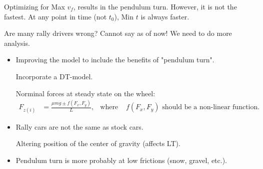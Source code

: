 \begin{frame}{}

    \begin{block}{}
        Optimizing for Max $v_f$, results in the pendulum turn. \newline However, it is not the fastest. At any point in time (not $t_0$), Min $t$ is always faster.
    \end{block}
    \pause
    \begin{exampleblock}{Are many rally drivers wrong?}
        Cannot say as of now! We need to do more analysis.
    \end{exampleblock}

    \pause
    \begin{itemize}
        \item Improving the model to include the benefits of "pendulum turn". \par Incorporate a DT-model. \par Norminal forces at steady state on the wheel: \begin{align*}
            F_{z(i)} &= \frac{\mu m g \pm f(F_{x},F_y)}{L}, & \text{where }&  f(F_{x},F_y) \text{ should be a non-linear function.}
        \end{align*} \pause
        \item Rally cars are not the same as stock cars. \par Altering position of the center of gravity (affects LT). \pause
        \item Pendulum turn is more probably at low frictions (snow, gravel, etc.). 
    \end{itemize}    
\end{frame}
